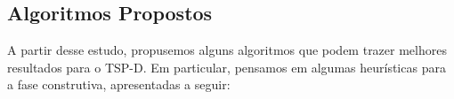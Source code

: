 \documentclass[12pt, a4paper]{article}
\begin{document}



\subsection{Algoritmos Propostos}

A partir desse estudo, propusemos alguns algoritmos que podem trazer melhores resultados para o TSP-D. Em particular, pensamos em algumas heurísticas para a fase construtiva, apresentadas a seguir:
\end{document}

